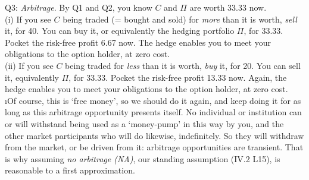 \documentclass[12pt]{article}
\begin{document}
\ni Q3: {\it Arbitrage}.  By Q1 and Q2, you know $C$ and $\Pi$ are worth 33.33 now. \\
(i) If you see $C$ being traded (= bought and sold) for {\it more} than it is worth, {\it sell} it, for 40.  You can buy it, or equivalently the hedging portfolio $\Pi$, for 33.33.  Pocket the risk-free profit 6.67 now.  The hedge enables you to meet your obligations to the option holder, at zero cost. \\
(ii) If you see $C$ being traded for {\it less} than it is worth, {\it buy} it, for 20.  You can sell it, equivalently $\Pi$, for 33.33.  Pocket the risk-free profit 13.33 now.  Again, the hedge enables you to meet your obligations to the option holder, at zero cost. \\

\i Of course, this is `free money', so we should do it again, and keep doing it for as long as this arbitrage opportunity presents itself.  No individual or institution can or will withstand being used as a `money-pump' in this way by you, and the other market participants who will do likewise, indefinitely.  So they will withdraw from the market, or be driven from it: arbitrage opportunities are transient.  That is why assuming {\it no arbitrage (NA)}, our standing assumption (IV.2 L15), is reasonable to a first approximation. \\
\end{document}
